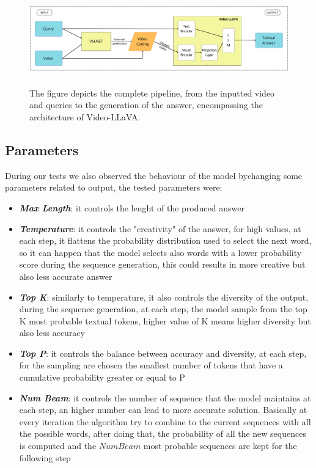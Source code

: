 \documentclass[10pt,twocolumn,letterpaper]{article}
\begin{document}
\begin{figure}
  \includegraphics[width=\textwidth,height=4cm]{FinalProposedPipeline.png}
  \caption{The figure depicts the complete pipeline, from the inputted video and queries to the generation of the answer, encompassing the architecture of Video-LLaVA.}
  \label{fig:fullPipeline}
\end{figure}

\subsection{Parameters}
\label{subsec:Parameters}
During our tests we also observed the behaviour of the model bychanging some parameters related to output, the tested parameters were:

\begin{itemize}
\setlength{\parskip}{0.05cm} 
    \item \textit{\textbf{Max Length}}: it controls the lenght of the produced answer
    \item \textit{\textbf{Temperature}}: it controls the "creativity" of the answer, for high values, at each step, it flattens the probability distribution used to select the next word, so it can happen that the model selects also words with a lower probability score during the sequence generation, this could results in more creative but also less accurate answer
    \item \textit{\textbf{Top K}}: similarly to temperature, it also controls the diversity of the output, during the sequence generation, at each step, the model sample from the top K most probable textual tokens, higher value of K means higher diversity but also less accuracy
    \item \textit{\textbf{Top P}}: it controls the balance between accuracy and diversity, at each step, for the sampling are chosen the smallest number of tokens that have a cumulative probability greater or equal to P
     \item \textit{\textbf{Num Beam}}: it controls the number of sequence that the model maintains at each step, an higher number can lead to more accurate solution. Basically at every iteration the algorithm try to combine to the current sequences with all the possible words, after doing that, the probability of all the new sequences is computed and the $Num Beam$ most probable sequences are kept for the following step
    
\end{itemize}
\end{document}
